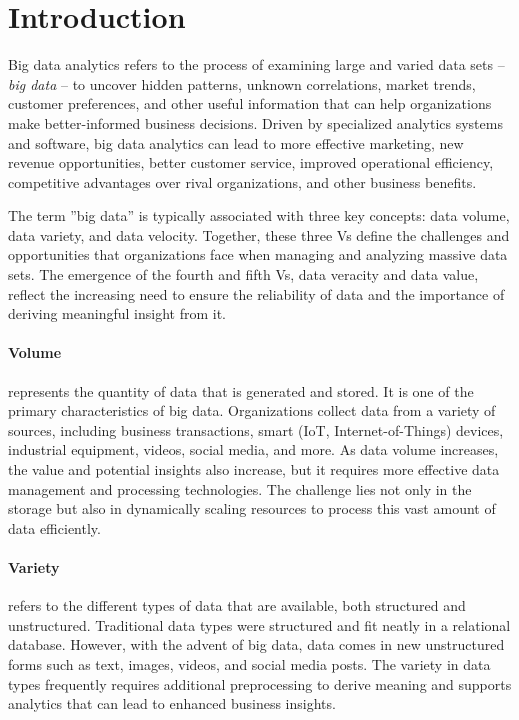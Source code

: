 \section{Introduction}

Big data analytics refers to the process of examining large and varied data sets -- \emph{big data} -- to uncover hidden patterns, unknown correlations, market trends, customer preferences, and other useful information that can help organizations make better-informed business decisions. Driven by specialized analytics systems and software, big data analytics can lead to more effective marketing, new revenue opportunities, better customer service, improved operational efficiency, competitive advantages over rival organizations, and other business benefits.

The term ''big data'' is typically associated with three key concepts: data volume, data variety, and data velocity. Together, these three Vs define the challenges and opportunities that organizations face when managing and analyzing massive data sets. The emergence of the fourth and fifth Vs, data veracity and data value, reflect the increasing need to ensure the reliability of data and the importance of deriving meaningful insight from it.

\paragraph*{Volume} represents the quantity of data that is generated and stored. It is one of the primary characteristics of big data. Organizations collect data from a variety of sources, including business transactions, smart (IoT, Internet-of-Things) devices, industrial equipment, videos, social media, and more. As data volume increases, the value and potential insights also increase, but it requires more effective data management and processing technologies. The challenge lies not only in the storage but also in dynamically scaling resources to process this vast amount of data efficiently.

\paragraph*{Variety} refers to the different types of data that are available, both structured and unstructured. Traditional data types were structured and fit neatly in a relational database. However, with the advent of big data, data comes in new unstructured forms such as text, images, videos, and social media posts. The variety in data types frequently requires additional preprocessing to derive meaning and supports analytics that can lead to enhanced business insights.

